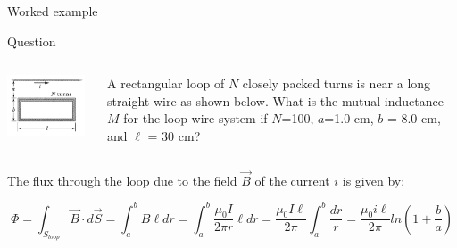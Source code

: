 
%
%

{
\problemslide

\begin{frame}{Worked example}

\vspace{-0.2cm}

\begin{blockexmplque}{Question}
  \vspace{-0.4cm}
  \begin{columns}
    \begin{column}{0.24\textwidth}
      \begin{center}
        \includegraphics[width=0.95\textwidth]{./images/problems/lect11_wire_and_loop}\\
       \end{center}
    \end{column}
    \begin{column}{0.76\textwidth}
      A rectangular loop of $N$ closely packed turns is near a long
      straight wire as shown below. What is the mutual inductance $M$
      for the loop-wire system if $N$=100, $a$=1.0 cm, $b$ = 8.0 cm,
      and $\ell$ = 30 cm?
    \end{column}
  \end{columns}
\end{blockexmplque}

The flux through the loop due to the field $\vec{B}$ of the current $i$ is given by:

\begin{equation*}
  \Phi = \int_{S_{loop}} \vec{B} \cdot d\vec{S}
       = \int_{a}^{b} B \ell dr
       = \int_{a}^{b} \frac{\mu_0 I}{2 \pi r} \ell dr
       = \frac{\mu_0 I \ell}{2\pi} \int_{a}^{b} \frac{dr}{r}
       = \frac{\mu_0 i \ell}{2\pi} ln(1 + \frac{b}{a})
\end{equation*}


\end{frame}}
